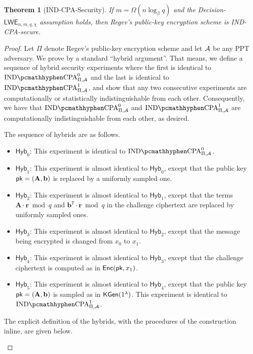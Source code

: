 \documentclass[10pt,twoside]{article}
\newcounter{lecnum}
\newtheorem{theorem}{Theorem}[lecnum]
\renewcommand{\vec}[1]{\mathbf{#1}}
\newcommand{\mat}[1]{\mathbf{#1}}
\newcommand{\transpose}{\mathtt{T}}
\newcommand{\LWE}{\mathsf{LWE}}
\newcommand{\Hyb}{\mathsf{Hyb}}
\begin{document}
\begin{theorem}[IND-CPA-Security]
    If $m = \Omega(n \log_\beta q)$ and the Decision-$\LWE_{n,m,q,\chi}$ assumption holds, then Regev's public-key encryption scheme is IND-CPA-secure.
\end{theorem}

\begin{proof}
    Let $\Pi$ denote Regev's public-key encryption scheme and let $\mathcal{A}$ be any PPT adversary.
    We prove by a standard ``hybrid argument''.
    That means, we define a sequence of hybrid security experiments where the first is identical to $\indcpa_{\Pi,\adv}^0$ and the last is identical to $\indcpa_{\Pi,\adv}^1$, and show that any two consecutive experiments are computationally or statistically indistinguishable from each other.
    Consequently, we have that $\indcpa_{\Pi,\adv}^0$ and $\indcpa_{\Pi,\adv}^1$ are computationally indistinguishable from each other, as desired.

    The sequence of hybrids are as follows.
    \begin{itemize}
        \item $\Hyb_0$: This experiment is identical to $\indcpa_{\Pi,\adv}^0$.
        \item $\Hyb_1$: This experiment is almost identical to $\Hyb_0$, except that the public key $\pk = (\mat{A},\vec{b})$ is replaced by a uniformly sampled one.
        \item $\Hyb_2$: This experiment is almost identical to $\Hyb_1$, except that the terms $\mat{A} \cdot \vec{r} \bmod q$ and $\vec{b}^\transpose \cdot \vec{r} \bmod q$ in the challenge ciphertext are replaced by uniformly sampled ones.
        \item $\Hyb_3$: This experiment is almost identical to $\Hyb_2$, except that the message being encrypted is changed from $x_0$ to $x_1$.
        \item $\Hyb_4$: This experiment is almost identical to $\Hyb_3$, except that the challenge ciphertext is computed as in $\enc(\pk,x_1)$.
        \item $\Hyb_5$: This experiment is almost identical to $\Hyb_4$, except that the public key $\pk = (\mat{A},\vec{b})$ is sampled as in $\mathsf{KGen}(1^{\lambda})$. This experiment is identical to $\indcpa_{\Pi,\adv}^1$.
    \end{itemize}

    The explicit definition of the hybrids, with the procedures of the construction inline, are given below.
    \begin{pcvstack}


\end{pcvstack}
\end{proof}
\end{document}
